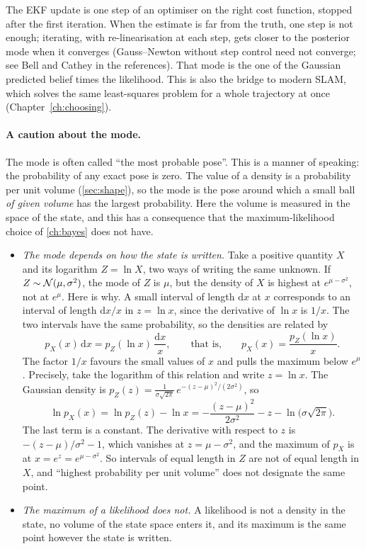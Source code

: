 \begin{inwords}
The EKF update is one step of an optimiser on the right cost function,
stopped after the first iteration. When the estimate is far from the
truth, one step is not enough; iterating, with re-linearisation at each
step, gets closer to the posterior mode when it converges (Gauss--Newton
without step control need not converge; see Bell and Cathey in the
references). That mode is the one of the Gaussian predicted belief times
the likelihood. This is also the bridge to
modern SLAM, which solves the same least-squares problem for a whole
trajectory at once (Chapter~\ref{ch:choosing}).
\end{inwords}

\paragraph{A caution about the mode.} The mode is often called ``the most
probable pose''. This is a manner of speaking: the probability of any
exact pose is zero. The value of a density is a probability per unit
volume (\cref{sec:shape}), so the mode is the pose around which a small
ball \emph{of given volume} has the largest probability. Here the volume
is measured in the space of the state, and this has a consequence that the
maximum-likelihood choice of \cref{ch:bayes} does not have.
\begin{itemize}[nosep]
  \item \emph{The mode depends on how the state is written.} Take a
    positive quantity $X$ and its logarithm $Z=\ln X$, two ways of writing
    the same unknown. If $Z\sim\mathcal{N}(\mu,\sigma^2)$, the mode of $Z$ is
    $\mu$, but the density of $X$ is highest at $e^{\mu-\sigma^2}$, not at
    $e^\mu$. Here is why. A small interval of length $\mathrm dx$ at $x$
    corresponds to an interval of length $\mathrm dx/x$ in $z=\ln x$,
    since the derivative of $\ln x$ is $1/x$. The two intervals have the
    same probability, so the densities are related by
    \[
      p_X(x)\,\mathrm dx=p_Z(\ln x)\,\frac{\mathrm dx}{x},
      \qquad\text{that is,}\qquad p_X(x)=\frac{p_Z(\ln x)}{x}.
    \]
    The factor $1/x$ favours the small values of $x$ and pulls the maximum
    below $e^\mu$. Precisely, take the logarithm of this relation and write
    $z=\ln x$. The Gaussian density is
    $p_Z(z)=\frac{1}{\sigma\sqrt{2\pi}}\,e^{-(z-\mu)^2/(2\sigma^2)}$, so
    \[
      \ln p_X(x)=\ln p_Z(z)-\ln x
      =-\frac{(z-\mu)^2}{2\sigma^2}-z-\ln\bigl(\sigma\sqrt{2\pi}\bigr).
    \]
    The last term is a constant. The derivative with respect to $z$ is
    $-(z-\mu)/\sigma^2-1$, which vanishes at $z=\mu-\sigma^2$, and the
    maximum of $p_X$ is at $x=e^z=e^{\mu-\sigma^2}$. So intervals
    of equal length in $Z$ are not of equal length in $X$, and ``highest
    probability per unit volume'' does not designate the same point.
  \item \emph{The maximum of a likelihood does not.} A likelihood is not a
    density in the state, no volume of the state space enters it, and its
    maximum is the same point however the state is written.
\end{itemize}
